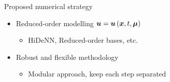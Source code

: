 \documentclass[aspectratio=1610, 10pt]{beamer}
\begin{document}
\begin{frame}
\begin{minipage}[t]{0.48\linewidth}
\begin{greenblockshadow}{Proposed numerical strategy}
				\begin{itemize}
					\item Reduced-order modelling $\boldsymbol{u} = \boldsymbol{u}\left(\boldsymbol{x},t,\boldsymbol{\mu}\right)$
					\begin{itemize}
						\item[\textcolor{GreenLMS}{\faCogs}] HiDeNN, Reduced-order bases, etc.
					\end{itemize}
					\item Robust and flexible methodology
					\begin{itemize}
						\item Modular approach, keep each step separated
					\end{itemize}
				\end{itemize}
			\end{greenblockshadow}
		\end{minipage}
	\end{frame}
\end{document}

